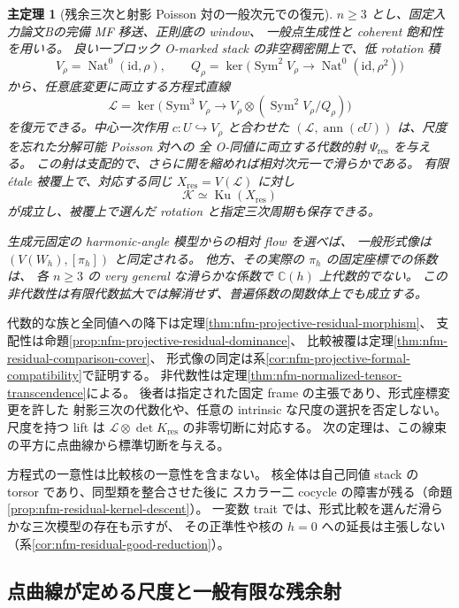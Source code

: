 \documentclass[11pt,a4paper]{ltjsarticle}
\numberwithin{equation}{section}
\newtheorem{maintheorem}{主定理}
\newcommand{\C}{\mathbb C}
\newcommand{\Sym}{\operatorname{Sym}}
\begin{document}
\begin{maintheorem}[残余三次と射影 Poisson 対の一般次元での復元]
$n\ge3$ とし、固定入力論文Bの完備 MF 移送、正則底の window、
一般点生成性と coherent 飽和性を用いる。
良い一ブロック O-marked stack の非空稠密開上で、低 rotation 積
\[
 V_\rho=\operatorname{Nat}^0(\mathrm{id},\rho),\qquad
 Q_\rho=\ker\bigl(\Sym^2V_\rho\to
              \operatorname{Nat}^0(\mathrm{id},\rho^2)\bigr)
\]
から、任意底変更に両立する方程式直線
\[
 \mathcal L=\ker\bigl(\Sym^3V_\rho\to
       V_\rho\otimes(\Sym^2V_\rho/Q_\rho)\bigr)
\]
を復元できる。中心一次作用 $c:U\hookrightarrow V_\rho$ と合わせた
$(\mathcal L,\operatorname{ann}(cU))$ は、尺度を忘れた分解可能 Poisson 対への
全 O-同値に両立する代数的射 $\Psi_{\mathrm{res}}$ を与える。
この射は支配的で、さらに開を縮めれば相対次元一で滑らかである。
有限 \'etale 被覆上で、対応する同じ $X_{\mathrm{res}}=V(\mathcal L)$ に対し
\[
 \mathcal K\simeq\operatorname{Ku}(X_{\mathrm{res}})
\]
が成立し、被覆上で選んだ rotation と指定三次周期も保存できる。

生成元固定の harmonic-angle 模型からの相対 flow を選べば、
一般形式像は $(V(W_h),[\pi_h])$ と同定される。
他方、その実際の $\pi_h$ の固定座標での係数は、
各 $n\ge3$ の very general な滑らかな係数で $\C(h)$ 上代数的でない。
この非代数性は有限代数拡大では解消せず、普遍係数の関数体上でも成立する。
\end{maintheorem}

代数的な族と全同値への降下は定理\ref{thm:nfm-projective-residual-morphism}、
支配性は命題\ref{prop:nfm-projective-residual-dominance}、
比較被覆は定理\ref{thm:nfm-residual-comparison-cover}、
形式像の同定は系\ref{cor:nfm-projective-formal-compatibility}で証明する。
非代数性は定理\ref{thm:nfm-normalized-tensor-transcendence}による。
後者は指定された固定 frame の主張であり、形式座標変更を許した
射影三次の代数化や、任意の intrinsic な尺度の選択を否定しない。
尺度を持つ lift は $\mathcal L\otimes\det K_{\mathrm{res}}$ の非零切断に対応する。
次の定理は、この線束の平方に点曲線から標準切断を与える。

方程式の一意性は比較核の一意性を含まない。
核全体は自己同値 stack の torsor であり、同型類を整合させた後に
スカラー二 cocycle の障害が残る（命題\ref{prop:nfm-residual-kernel-descent}）。
一変数 trait では、形式比較を選んだ滑らかな三次模型の存在も示すが、
その正準性や核の $h=0$ への延長は主張しない
（系\ref{cor:nfm-residual-good-reduction}）。

\subsection{点曲線が定める尺度と一般有限な残余射}
\end{document}
